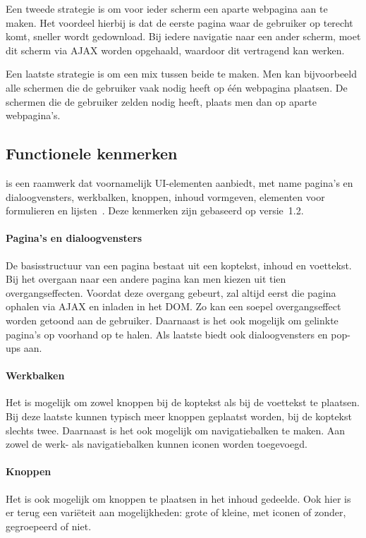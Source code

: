 Een tweede strategie is om voor ieder scherm een aparte webpagina aan te maken. 
Het voordeel hierbij is dat de eerste pagina waar de gebruiker op terecht komt, sneller wordt gedownload. 
Bij iedere navigatie naar een ander scherm, moet dit scherm via AJAX worden opgehaald, waardoor dit vertragend kan werken. 

Een laatste strategie is om een mix tussen beide te maken. 
Men kan bijvoorbeeld alle schermen die de gebruiker vaak nodig heeft op één webpagina plaatsen. 
De schermen die de gebruiker zelden nodig heeft, plaats men dan op aparte webpagina's.  

\subsection{Functionele kenmerken}
\jqm{} is een raamwerk dat voornamelijk UI-elementen aanbiedt, met name pagina's en dialoogvensters, werkbalken, knoppen, inhoud vormgeven, elementen voor formulieren en lijsten~\cite{JQuery2012b}.
Deze kenmerken zijn gebaseerd op versie~1.2.

\paragraph{Pagina's en dialoogvensters}
De basisstructuur van een pagina bestaat uit een koptekst, inhoud en voettekst. 
Bij het overgaan naar een andere pagina kan men kiezen uit tien overgangseffecten. 
Voordat deze overgang gebeurt, zal \jqm{} altijd eerst die pagina ophalen via AJAX en inladen in het DOM. 
Zo kan een soepel overgangseffect worden getoond aan de gebruiker. 
Daarnaast is het ook mogelijk om gelinkte pagina's op voorhand op te halen. 
Als laatste biedt \jqm{} ook dialoogvensters en pop-ups aan. 

\paragraph{Werkbalken}
Het is mogelijk om zowel knoppen bij de koptekst als bij de voettekst te plaatsen. 
Bij deze laatste kunnen typisch meer knoppen geplaatst worden, bij de koptekst slechts twee. 
Daarnaast is het ook mogelijk om navigatiebalken te maken. 
Aan zowel de werk- als navigatiebalken kunnen iconen worden toegevoegd.

\paragraph{Knoppen}
Het is ook mogelijk om knoppen te plaatsen in het inhoud gedeelde. 
Ook hier is er terug een variëteit aan mogelijkheden: grote of kleine, met iconen of zonder, gegroepeerd of niet. 

